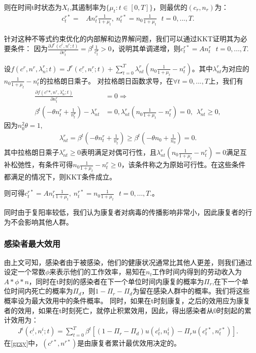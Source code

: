 则在时间t时状态为$X_t$,其遏制率为$\{\mu_t:t\in[0,T]\}$，则最优的$(c_r,n_r)$为：
\begin{align*}
    c_{t}^{r*}=&A n_{t}^{r} \frac{1}{1+\mu_t},\ n_t^{r*}=n_0\frac{1}{1+\mu_t} \ \ \ t=0,...,T.
\end{align*}

针对这种不等式约束优化的内部解和边界解问题，我们可以通过KKT证明其为必要条件：
因为$\frac{\partial J^r(c_.^r,n_.^r;t)}{\partial c_t^r}=\beta^t\frac{1}{c_t^r} >0$，说明其单调递增，则$c_{t}^{r*}=A n_{t}^{r}\ \ \ t=0,...,T.$

设$f(c^r,n^r,\lambda_n^r;t)=J^r(c_.^r,n_.^r;t)+\sum_{t=0}^{T}\lambda_{nt}^r(n_0\frac{1}{1+\mu_t}-n_t^r)$。其中$\lambda_{nt}^r$为对应的$n_0\frac{1}{1+\mu_t}-n_t^r$的拉格朗日乘子。
对拉格朗日函数求导，在$\forall t=0,...,T$上，我们有
\begin{align*}
    \frac{\partial f(c^r*,n^r,\lambda_n^r;t)}{\partial n_t^r}&=0\Rightarrow \\
	\beta^t(-\theta n_t^r+\frac{1}{n_t^r})-\lambda_{nt}^r&=0, \lambda_{nt}^r(n_0\frac{1}{1+\mu_t}-n_t^r)=0, \ \ \lambda_{nt}^r \geq 0 ,
\end{align*}
因为$n_0^2\theta=1$,
\begin{align*}
    \lambda_{nt}^r=\beta^t(-\theta n_t^r+\frac{1}{n_t^r}) \geq \beta^t(-\theta n_0+\frac{1}{n_0})=0.
\end{align*}
其中拉格朗日乘子$\lambda_{nt}^r \geq 0$表明满足对偶可行性，且$\lambda_{nt}^r(n_0\frac{1}{1+\mu_t}-n_t^r)=0$满足互补松弛性，有条件可得$n_0\frac{1}{1+\mu_t}-n_t^r \geq 0$，该条件称之为原始可行性。在这些条件都满足的情况下，则KKT条件成立。

则可得$c_{t}^{r*}=A n_{t}^{r} \frac{1}{1+\mu_t},\ n_t^{r*}=n_0\frac{1}{1+\mu_t} \ \ \ t=0,...,T.$。

同时由于复阳率较低，我们认为康复者对病毒的传播影响非常小，因此康复者的行为不会影响其他人群。
\subsubsection{感染者最大效用}

由上文可知，感染者由于被感染，他们的健康状况通常比其他人更差，则我们通过设定一个常数$\phi$来表示他们的工作效率，易知在$n_t$工作时间内得到的劳动收入为$A*\phi*n$，同时在t时刻的感染者在下一个单位时间内康复的概率为$\Pi_r$,在下一个单位时间内死亡的概率为$\Pi_d$，则$1-\Pi_r-\Pi_d$为留在感染人群中的概率。我们将这些概率设为最大效用中的条件概率。
同时，如果在t时刻康复，之后的效用应为康复者的效用，如果在t时刻死亡，就停止积累效用，因此，得出感染者从0时刻起的累计效用为：
\begin{align}\label{grxy}
    J^i(c_{.}^{i},n_{.}^{i};t)=\sum_{t=0}^{T}\beta^t[(1-\Pi_r-\Pi_d)u(c_t^i,n_t^i)-\Pi_r u(c_t^{r*},n_t^{r*})] .
\end{align}
在\ref{grxy}中，$(c^{r*},n^{r*})$是由康复者累计最优效用决定的。

